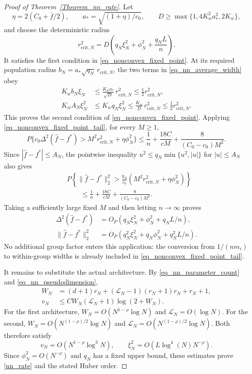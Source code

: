\documentclass[twoside,11pt]{article}
\newenvironment{revision}{\color{revisionred}}{}
\begin{document}
\begin{revision}
\begin{proof}[Proof of Theorem~\ref{Theorem_nn_rate}]
Let
\[
\eta=2(C_0+\bar f/2),\qquad
a_*=\sqrt{(1+\eta)/c_0},\qquad
D\geq\max\{1,4K_w^2a_*^2,2K_w\},
\]
and choose the deterministic radius
\[
r_{\mathrm{crit},N}^2
=D\left(q_N\xi_N^2+\phi_N^2+\frac{q_NL}{n}\right).
\]
It satisfies the first condition in
\eqref{eq_nonconvex_fixed_point}. At its required population
radius $b_N=a_*\sqrt{q_N}\,r_{\mathrm{crit},N}$, the two terms
in \eqref{eq_nn_average_width} obey
\begin{align*}
K_wb_N\xi_N
&\leq\frac{K_wa_*}{\sqrt D}\,r_{\mathrm{crit},N}^2
\leq\frac12r_{\mathrm{crit},N}^2,\\
K_wA_N\xi_N^2
&\leq K_wq_N\xi_N^2
\leq\frac{K_w}{D}\,r_{\mathrm{crit},N}^2
\leq\frac12r_{\mathrm{crit},N}^2.
\end{align*}
This proves the second condition of
\eqref{eq_nonconvex_fixed_point}. Applying
\eqref{eq_nonconvex_fixed_point_tail}, for every $M\geq1$,
\[
P\{c_0\Delta^2(\hat f-f^*)>
 M^2r_{\mathrm{crit},N}^2+\eta\phi_N^2\}
\leq\frac1n+\frac{18C}{cM}+\frac8{(C_0-c_0)M^2}.
\]
Since $|\hat f-f^*|\leq A_N$, the pointwise inequality
$u^2\leq q_N\min\{u^2,|u|\}$ for $|u|\leq A_N$ also gives
\begin{align*}
&P\left\{\|\hat f-f^*\|_2^2>
 \frac{q_N}{c_0}
 \left(M^2r_{\mathrm{crit},N}^2+\eta\phi_N^2\right)\right\}\\
&\qquad\leq\frac1n+\frac{18C}{cM}
                 +\frac8{(C_0-c_0)M^2}.
\end{align*}
Taking a sufficiently large fixed $M$ and then letting
$n\to\infty$ proves
\begin{align*}
\Delta^2(\hat f-f^*)
&=O_P(q_N\xi_N^2+\phi_N^2+q_NL/n),\\
\|\hat f-f^*\|_2^2
&=O_P(q_N^2\xi_N^2+q_N\phi_N^2+q_N^2L/n).
\end{align*}
No additional group factor enters this application: the
conversion from $1/(nm_i)$ to within-group widths is already
included in \eqref{eq_nonconvex_fixed_point_tail}.

It remains to substitute the actual architecture. By
\eqref{eq_nn_parameter_count} and \eqref{eq_nn_pseudodimension},
\[
\begin{aligned}
W_N&=(d+1)r_N+(\mathcal L_N-1)(r_N+1)r_N+r_N+1,\\
v_N&\leq C W_N(\mathcal L_N+1)\log(2+W_N).
\end{aligned}
\]
For the first architecture,
$W_N=O(N^{1-\rho}\log N)$ and
$\mathcal L_N=O(\log N)$.
For the second,
$W_N=O(N^{(1-\rho)/2}\log N)$ and
$\mathcal L_N=O(N^{(1-\rho)/2}\log N)$.
Both therefore satisfy
\[
v_N=O(N^{1-\rho}\log^3N),
\qquad
\xi_N^2=O(L\log^4(N)N^{-\rho}).
\]
Since $\phi_N^2=O(N^{-\rho})$ and $q_N$ has a fixed upper
bound, these estimates prove \eqref{nn_rate} and the stated
Huber order.


\end{proof}
\end{revision}
\end{document}
